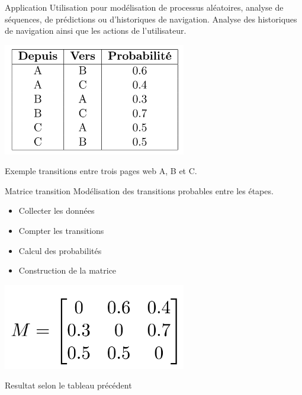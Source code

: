 \begin{frame}{Application}
	\vspace*{-0.3cm}
	Utilisation pour modélisation de processus aléatoires, analyse de séquences, de prédictions ou d'historiques de navigation.
	Analyse des historiques de navigation ainsi que les actions de l'utilisateur.

	\begin{center}
		\includegraphics[width=0.6\textwidth]{images/tableau_proba_markov.png}
		\par
		Exemple transitions entre trois pages web A, B et C.
	\end{center}
\end{frame}

\begin{frame}{Matrice transition}
	Modélisation des transitions probables entre les étapes.
	\begin{itemize}
		\item Collecter les données
		\item Compter les transitions
		\item Calcul des probabilités
		\item Construction de la matrice
	\end{itemize}
	\begin{center}
		\includegraphics[width=0.6\textwidth]{images/matrice_transition.png}
		\par
		Resultat selon le tableau précédent
	\end{center}
\end{frame}

